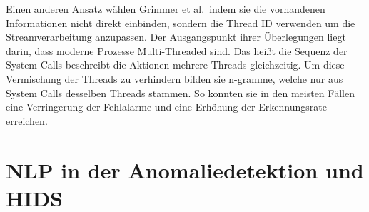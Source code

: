        Einen anderen Ansatz wählen Grimmer et al.\ indem sie die vorhandenen Informationen nicht direkt einbinden, sondern die Thread ID verwenden um die Streamverarbeitung anzupassen.
        Der Ausgangspunkt ihrer Überlegungen liegt darin, dass moderne Prozesse Multi-Threaded sind.
        Das heißt die Sequenz der System Calls beschreibt die Aktionen mehrere Threads gleichzeitig.
        Um diese Vermischung der Threads zu verhindern bilden sie n-gramme, welche nur aus System Calls desselben Threads stammen.
        So konnten sie in den meisten Fällen eine Verringerung der Fehlalarme und eine Erhöhung der Erkennungsrate erreichen.\cite{IDSTHREADGRIMMER2021}

        

\section{NLP in der Anomaliedetektion und HIDS}\label{sec:related_nlp}

